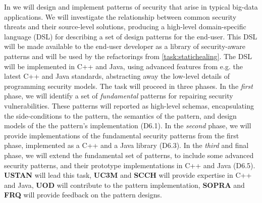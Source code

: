 \begin{Workpackage}{\thewpno}
\begin{Task}
%
%
\end{Task}

\begin{Task}
	\TaskResults{%
	}
	\TaskHeader{}
	
In \theTask{} we will design and implement patterns of security that arise in typical big-data applications. We will investigate the relationship between common security threats and their source-level solutions, producing a high-level domain-specific language (DSL) for describing a set of design patterns for the end-user. This DSL will be made available to the end-user developer as a library of security-aware patterns and will be used by the refactorings from \ref{task:statichealing}. The DSL will be implemented in C++ and Java, using advanced features from e.g. the latest C++ and Java standards, abstracting away the low-level details of programming security models.
%
The task will proceed in three phases. In the \emph{first} phase, we will identify a set of \emph{fundamental} patterns for repairing security vulnerabilities. These patterns will reported as high-level schemas, encapsulating the side-conditions to the pattern, the semantics of the pattern, and design models of the the pattern's implementation (D6.1).
In the \emph{second} phase, we will provide implementations of the fundamental security patterns from the first phase, implemented as a C++ and a Java library (D6.3). In the \emph{third} and final phase, we will extend the fundamental set of patterns, to include some advanced security patterns, and their prototype implementations in C++ and Java (D6.5).  \textbf{USTAN} will lead this task, \textbf{UC3M} and \textbf{SCCH} will provide expertise in C++ and Java, \textbf{UOD} will contribute to the pattern implementation, \textbf{SOPRA} and \textbf{FRQ} will provide feedback on the pattern designs. 
\end{Task}


\end{Workpackage}
